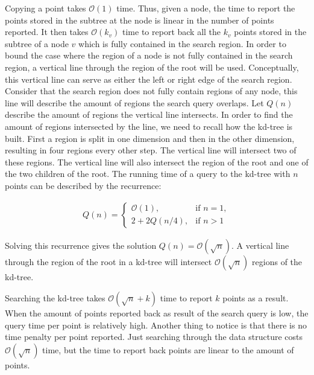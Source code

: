 Copying a point takes $\mathcal{O}(1)$ time. Thus, given a node, the time to report the points stored in the subtree at the node is linear in the number of points reported. It then takes $\mathcal{O}(k_v)$ time to report back all the $k_v$ points stored in the subtree of a node $v$ which is fully contained in the search region. In order to bound the case where the region of a node is not fully contained in the search region, a vertical line through the region of the root will be used. Conceptually, this vertical line can serve as either the left or right edge of the search region. Consider that the search region does not fully contain regions of any node, this line will describe the amount of regions the search query overlaps. Let $Q(n)$ describe the amount of regions the vertical line intersects. In order to find the amount of regions intersected by the line, we need to recall how the kd-tree is built. First a region is split in one dimension and then in the other dimension, resulting in four regions every other step. The vertical line will intersect two of these regions. The vertical line will also intersect the region of the root and one of the two children of the root. The running time of a query to the kd-tree with $n$ points can be described by the recurrence:

\begin{align*}
  Q(n) = \begin{cases}
    \mathcal{O}(1), & \text{if } n = 1,\\
    2 + 2Q(n/4), & \text{if } n > 1
  \end{cases}
\end{align*}

Solving this recurrence gives the solution $Q(n) = \mathcal{O}(\sqrt{n})$. A vertical line through the region of the root in a kd-tree will intersect $\mathcal{O}(\sqrt{n})$ regions of the kd-tree.


Searching the kd-tree takes $\mathcal{O}(\sqrt{n} + k)$ time to report $k$ points as a result. When the amount of points reported back as result of the search query is low, the query time per point is relatively high. Another thing to notice is that there is no time penalty per point reported. Just searching through the data structure costs $\mathcal{O}(\sqrt{n})$ time, but the time to report back points are linear to the amount of points.


